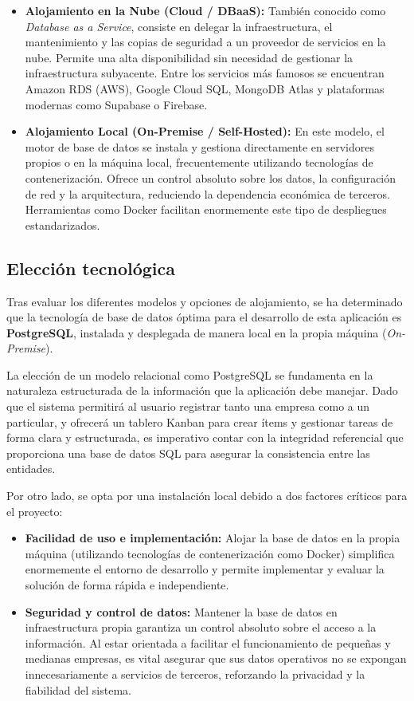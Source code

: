 \documentclass[12pt, a4paper]{book}
\begin{document}
\begin{itemize}
    \item \textbf{Alojamiento en la Nube (Cloud / DBaaS):} También conocido como \textit{Database as a Service}, consiste en delegar la infraestructura, el mantenimiento y las copias de seguridad a un proveedor de servicios en la nube. Permite una alta disponibilidad sin necesidad de gestionar la infraestructura subyacente. Entre los servicios más famosos se encuentran Amazon RDS (AWS), Google Cloud SQL, MongoDB Atlas y plataformas modernas como Supabase o Firebase.

    \item \textbf{Alojamiento Local (On-Premise / Self-Hosted):} En este modelo, el motor de base de datos se instala y gestiona directamente en servidores propios o en la máquina local, frecuentemente utilizando tecnologías de contenerización. Ofrece un control absoluto sobre los datos, la configuración de red y la arquitectura, reduciendo la dependencia económica de terceros. Herramientas como Docker facilitan enormemente este tipo de despliegues estandarizados.
\end{itemize}

\subsection{Elección tecnológica}

Tras evaluar los diferentes modelos y opciones de alojamiento, se ha determinado que la tecnología de base de datos óptima para el desarrollo de esta aplicación es \textbf{PostgreSQL}, instalada y desplegada de manera local en la propia máquina (\textit{On-Premise}).

La elección de un modelo relacional como PostgreSQL se fundamenta en la naturaleza estructurada de la información que la aplicación debe manejar. Dado que el sistema permitirá al usuario registrar tanto una empresa como a un particular, y ofrecerá un tablero Kanban para crear ítems y gestionar tareas de forma clara y estructurada, es imperativo contar con la integridad referencial que proporciona una base de datos SQL para asegurar la consistencia entre las entidades.

Por otro lado, se opta por una instalación local debido a dos factores críticos para el proyecto:

\begin{itemize}
    \item \textbf{Facilidad de uso e implementación:} Alojar la base de datos en la propia máquina (utilizando tecnologías de contenerización como Docker) simplifica enormemente el entorno de desarrollo y permite implementar y evaluar la solución de forma rápida e independiente.
    \item \textbf{Seguridad y control de datos:} Mantener la base de datos en infraestructura propia garantiza un control absoluto sobre el acceso a la información. Al estar orientada a facilitar el funcionamiento de pequeñas y medianas empresas, es vital asegurar que sus datos operativos no se expongan innecesariamente a servicios de terceros, reforzando la privacidad y la fiabilidad del sistema.
\end{itemize}
\end{document}
